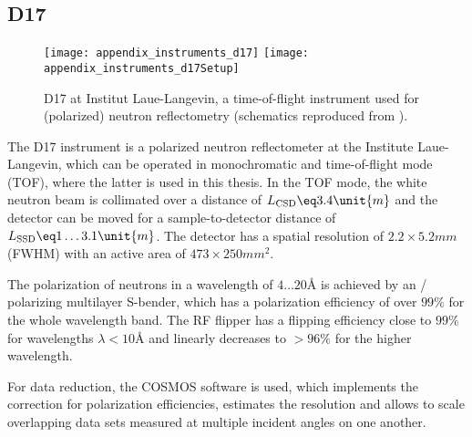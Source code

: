 \documentclass[\main/dresen_thesis.tex]{subfiles}
\begin{document}
  \subsection{D17}\label{ch:lss:d17}

    \begin{figure}[ht]
      \centering
      \texttt{[image: appendix\_instruments\_d17]}
      \texttt{[image: appendix\_instruments\_d17Setup]}
      \caption{\label{fig:lss:d17}D17 at Institut Laue-Langevin, a time-of-flight instrument used for (polarized) neutron reflectometry (schematics reproduced from \cite{Saerbeck_2018_Recen}).}
    \end{figure}
    The D17 instrument \cite{Saerbeck_2018_Recen} is a polarized neutron reflectometer at the Institute Laue-Langevin, which can be operated in monochromatic and time-of-flight mode (TOF), where the latter is used in this thesis.
    In the TOF mode, the white neutron beam is collimated over a distance of $L_\mathrm{CSD} \eq 3.4 \unit{m}$ and the detector can be moved for a sample-to-detector distance of $L_\mathrm{SSD} \eq 1 \ldots 3.1 \unit{m}$.
    The detector has a spatial resolution of $2.2 \times 5.2 \unit{mm}$ (FWHM) with an active area of $473 \times 250 \unit{mm^2}$.

    The polarization of neutrons in a wavelength of $4 \ldots 20 \unit{\angstrom}$ is achieved by an / polarizing multilayer S-bender, which has a polarization efficiency of over $99 \unit{\%}$ for the whole wavelength band.
    The RF flipper has a flipping efficiency close to $99 \unit{\%}$ for wavelengths $\lambda < 10 \unit{\angstrom}$ and linearly decreases to $>96 \%$ for the higher wavelength.

    For data reduction, the COSMOS software \cite{Gutfreund_2018_Towar} is used, which implements the correction for polarization efficiencies, estimates the resolution and allows to scale overlapping data sets measured at multiple incident angles on one another.
\end{document}
